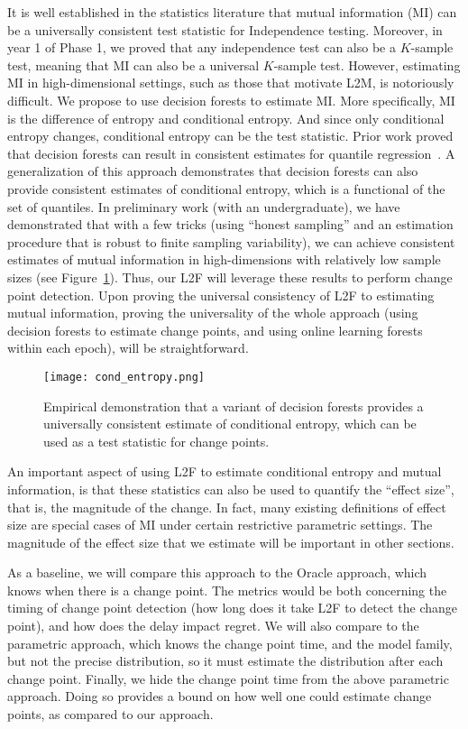 \documentclass{article}
\begin{document}
It is well established in the statistics literature that mutual information (MI) can be a universally consistent test statistic for Independence testing.  Moreover, in year 1 of Phase 1, we proved that any independence test can also be a $K$-sample test, meaning that MI can also be a universal $K$-sample test. However, estimating MI in high-dimensional settings, such as those that motivate L2M, is notoriously difficult.  We propose to use decision forests to estimate MI.  More specifically,  MI is the difference of entropy and conditional entropy.  And since only conditional entropy changes, conditional entropy can be the test statistic.  Prior work proved that decision forests can result in consistent estimates for quantile regression~\cite{Meinshausen2006-kw}.  A generalization of this approach demonstrates that decision forests can also provide consistent estimates of conditional entropy, which is a functional of the set of quantiles.  In preliminary work (with an undergraduate), we have demonstrated that with a few tricks (using ``honest sampling'' and an estimation procedure that is robust to finite sampling variability), we can achieve consistent estimates of mutual information in high-dimensions with relatively low sample sizes (see Figure~\ref{fig:cond_entropy}). Thus, our L2F will leverage these results to perform change point detection. Upon proving the universal consistency of L2F to estimating mutual information, proving the universality of the whole approach (using decision forests to estimate change points, and using online learning forests within each epoch), will be straightforward. 

\begin{figure}
    \centering
    \texttt{[image: cond\_entropy.png]}
    \caption{Empirical demonstration that a variant of decision forests provides a universally consistent estimate of conditional entropy, which can be used as a test statistic for change points.}
    \label{fig:cond_entropy}
\end{figure}

An important aspect of using L2F to estimate conditional entropy and mutual information, is that these statistics can also be used to quantify the ``effect size'', that is, the magnitude of the change.  In fact, many existing definitions of effect size are special cases of MI under certain restrictive parametric settings.  The magnitude of the effect size that we estimate will be important in other sections.


As a baseline, we will compare this approach to the Oracle approach, which knows when there is a change point.  The metrics would be both concerning the timing of change point detection (how long does it take L2F to detect the change point), and how does the delay impact regret. We will also compare to the parametric approach, which knows the change point time, and the model family, but not the precise distribution, so it must estimate the distribution after each change point. Finally, we hide the change point time from the above parametric approach. Doing so provides a bound on how well one could estimate change points, as compared to our approach. 
\end{document}
